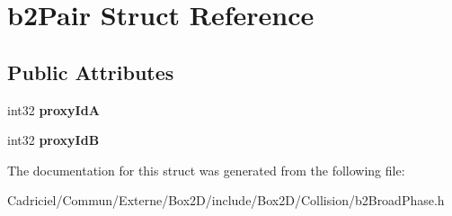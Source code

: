 \hypertarget{structb2_pair}{}\section{b2\+Pair Struct Reference}
\label{structb2_pair}
\subsection*{Public Attributes}
\begin{DoxyCompactItemize}
\item 
int32 {\bfseries proxy\+IdA}\hypertarget{structb2_pair_abae3df5e877cf0c4611334e3eec4b84c}{}\label{structb2_pair_abae3df5e877cf0c4611334e3eec4b84c}

\item 
int32 {\bfseries proxy\+IdB}\hypertarget{structb2_pair_af2bd888ccb34535ab9126497349da749}{}\label{structb2_pair_af2bd888ccb34535ab9126497349da749}

\end{DoxyCompactItemize}


The documentation for this struct was generated from the following file\+:\begin{DoxyCompactItemize}
\item 
Cadriciel/\+Commun/\+Externe/\+Box2\+D/include/\+Box2\+D/\+Collision/b2\+Broad\+Phase.\+h\end{DoxyCompactItemize}
